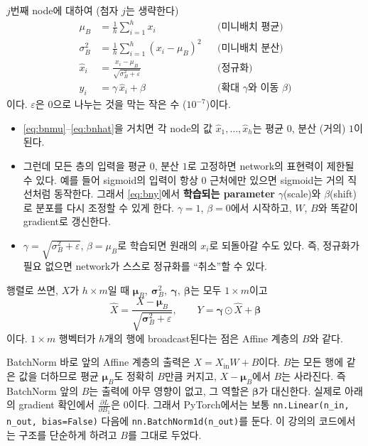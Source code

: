 \documentclass[11pt,a4paper]{article}
\newcommand{\pd}[2]{\frac{\partial #1}{\partial #2}}
\begin{document}
$j$번째 node에 대하여 (첨자 $j$는 생략한다)
\begin{align}
\mu_B &= \frac1h\sum_{i=1}^{h}x_i
&& \text{(미니배치 평균)}\label{eq:bnmu}\\
\sigma_B^2 &= \frac1h\sum_{i=1}^{h}(x_i-\mu_B)^2
&& \text{(미니배치 분산)}\label{eq:bnvar}\\
\hat x_i &= \frac{x_i-\mu_B}{\sqrt{\sigma_B^2+\varepsilon}}
&& \text{(정규화)}\label{eq:bnhat}\\
y_i &= \gamma\,\hat x_i+\beta
&& \text{(확대 $\gamma$와 이동 $\beta$)}\label{eq:bny}
\end{align}
이다. $\varepsilon$은 $0$으로 나누는 것을 막는 작은 수 ($10^{-7}$)이다.

\begin{itemize}[leftmargin=1.8em]
\item \eqref{eq:bnmu}--\eqref{eq:bnhat}을 거치면 각 node의 값 $\hat x_1,\ldots,\hat x_h$는
평균 $0$, 분산 (거의) $1$이 된다.
\item 그런데 모든 층의 입력을 평균 $0$, 분산 $1$로 고정하면 network의 표현력이 제한될 수 있다.
예를 들어 sigmoid의 입력이 항상 $0$ 근처에만 있으면 sigmoid는 거의 직선처럼 동작한다.
그래서 \eqref{eq:bny}에서 \textbf{학습되는 parameter} $\gamma$(scale)와 $\beta$(shift)로 분포를 다시 조정할 수 있게 한다.
$\gamma=1$, $\beta=0$에서 시작하고, $W$, $B$와 똑같이 gradient로 갱신한다.
\item $\gamma=\sqrt{\sigma_B^2+\varepsilon}$, $\beta=\mu_B$로 학습되면 원래의 $x_i$로 되돌아갈 수도 있다.
즉, 정규화가 필요 없으면 network가 스스로 정규화를 ``취소''할 수 있다.
\end{itemize}

행렬로 쓰면, $X$가 $h\times m$일 때 $\bm\mu_B,\ \bm\sigma_B^2,\ \bm\gamma,\ \bm\beta$는 모두 $1\times m$이고
\[
\hat X=\frac{X-\bm\mu_B}{\sqrt{\bm\sigma_B^2+\varepsilon}},\qquad
Y=\bm\gamma\odot\hat X+\bm\beta
\]
이다. $1\times m$ 행벡터가 $h$개의 행에 broadcast된다는 점은 Affine 계층의 $B$와 같다.

\begin{thinkbox}
BatchNorm 바로 앞의 Affine 계층의 출력은 $X=X_{\text{in}}W+B$이다.
$B$는 모든 행에 같은 값을 더하므로 평균 $\bm\mu_B$도 정확히 $B$만큼 커지고,
$X-\bm\mu_B$에서 $B$는 사라진다.
즉 BatchNorm 앞의 $B$는 출력에 아무 영향이 없고, 그 역할은 $\bm\beta$가 대신한다.
실제로 아래의 gradient 확인에서 $\pd{L}{B_1}$은 $0$이다.
그래서 PyTorch에서는 보통 \texttt{nn.Linear(n\_in, n\_out, bias=False)} 다음에 \texttt{nn.BatchNorm1d(n\_out)}를 둔다.
이 강의의 코드에서는 구조를 단순하게 하려고 $B$를 그대로 두었다.
\end{thinkbox}
\end{document}
